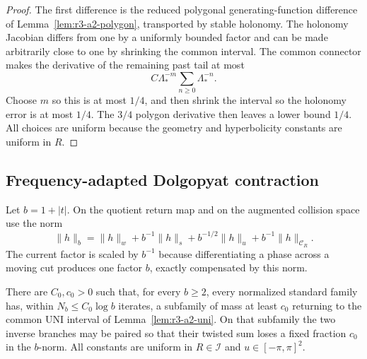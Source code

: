 \begin{proof}
The first difference is the reduced polygonal generating-function difference
of Lemma~\ref{lem:r3-a2-polygon}, transported by stable holonomy.  The
holonomy Jacobian differs from one by a uniformly bounded factor and can be
made arbitrarily close to one by shrinking the common interval.  The common
connector makes the derivative of the remaining past tail at most
\[
 C\Lambda_*^{-m}\sum_{n\ge0}\Lambda_*^{-n}.
\]
Choose \(m\) so this is at most \(1/4\), and then shrink the interval so the
holonomy error is at most \(1/4\).  The \(3/4\) polygon derivative then leaves
a lower bound \(1/4\).  All choices are uniform because the geometry and
hyperbolicity constants are uniform in \(R\).
\end{proof}

\subsection{Frequency-adapted Dolgopyat contraction}

Let \(b=1+|t|\).  On the quotient return map and on the augmented collision
space use the norm
\[
 \|h\|_{b}
 =\|h\|_{w}+b^{-1}\|h\|_{s}
   +b^{-1/2}\|h\|_{u}
   +b^{-1}\|h\|_{\mathcal C_R}.
\]
The current factor is scaled by \(b^{-1}\) because differentiating a phase
across a moving cut produces one factor \(b\), exactly compensated by this
norm.

\begin{lemma}
\label{lem:r4-a2-dolgopyat-block}
There are \(C_0,c_0>0\) such that, for every \(b\ge2\), every normalized
standard family has, within
\(N_b\le C_0\log b\) iterates, a subfamily of mass at least \(c_0\) returning
to the common UNI interval of Lemma~\ref{lem:r3-a2-uni}.  On that subfamily the
two inverse branches may be paired so that their twisted sum loses a fixed
fraction \(c_0\) in the \(b\)-norm.  All constants are uniform in
\(R\in\mathcal I\) and \(u\in[-\pi,\pi]^2\).
\end{lemma}

